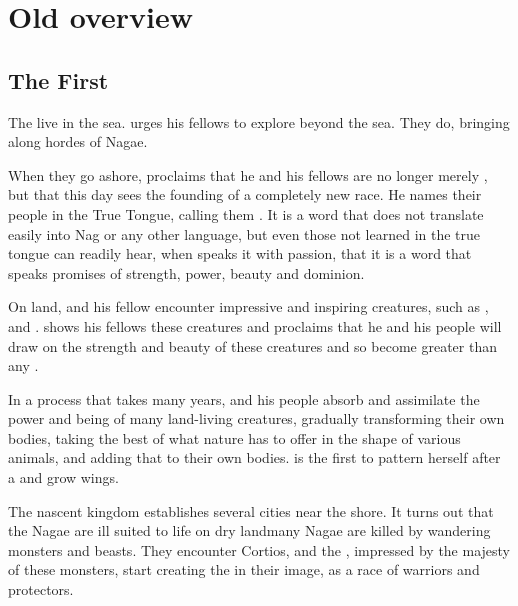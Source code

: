 \chapter{Old overview}
\section{The First \Dragons}
The \leviathans{} live in the sea. 
\HesodN{} urges his fellows to explore beyond the sea. 
They do, bringing along hordes of Nagae. 

When they go ashore, \HesodN{} proclaims that he and his fellows are no longer merely \leviathans{}, but that this day sees the founding of a completely new race. He names their people in the True Tongue, calling them \draecchonosh{}. It is a word that does not translate easily into Nag or any other language, but even those not learned in the true tongue can readily hear, when \HesodN{} speaks it with passion, that it is a word that speaks promises of strength, power, beauty and dominion. 

On land, \HesodN{} and his fellow \leviathans{} encounter impressive and inspiring creatures, such as \nycans, \cregorr{} and \wyverns{}. \HesodN{} shows his fellows these creatures and proclaims that he and his people will draw on the strength and beauty of these creatures and so become greater than any \leviathan. 

In a process that takes many years, \HesodN{} and his people absorb and assimilate the power and being of many land-living creatures, gradually transforming their own bodies, taking the best of what nature has to offer in the shape of various animals, and adding that to their own bodies. 
\TyarithXserasshana{} is the first to pattern herself after a \wyvern{} and grow wings. 

The nascent \draconic{} kingdom establishes several cities near the shore. It turns out that the Nagae are ill suited to life on dry land\dash many Nagae are killed by wandering monsters and beasts. They encounter Cortios, and the \dragons{}, impressed by the majesty of these monsters, start creating the \cregorr{} in their image, as a race of warriors and protectors. 

